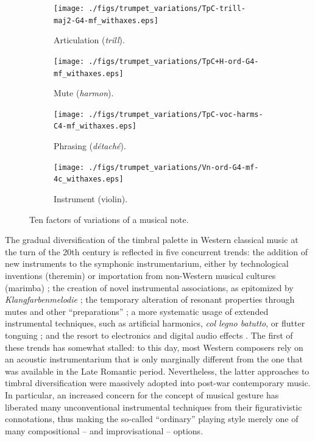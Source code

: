 \begin{figure}
        \begin{subfigure}[b]{0.25\textwidth}
                \centering
                \texttt{[image: ./figs/trumpet\_variations/TpC-trill-maj2-G4-mf\_withaxes.eps]}
                \caption{Articulation (\emph{trill}).}
                \label{fig:TpC-trill-maj2-G4-mf_withaxes}
        \end{subfigure}%
        \begin{subfigure}[b]{0.25\textwidth}
                \centering
                \texttt{[image: ./figs/trumpet\_variations/TpC+H-ord-G4-mf\_withaxes.eps]}
                \caption{Mute (\emph{harmon}).}
                \label{fig:TpC+H-ord-G4-mf_withaxes}
        \end{subfigure}

        \begin{subfigure}[b]{0.25\textwidth}
                \centering
                \texttt{[image: ./figs/trumpet\_variations/TpC-voc-harms-C4-mf\_withaxes.eps]}
                \caption{Phrasing (\emph{d\'{e}tach\'{e}}).}
                \label{fig:TpC+voc-harms-G4-mf_withaxes}
        \end{subfigure}%
        \begin{subfigure}[b]{0.25\textwidth}
                \centering
                \texttt{[image: ./figs/trumpet\_variations/Vn-ord-G4-mf-4c\_withaxes.eps]}
                \caption{Instrument (violin).}
                \label{fig:Vn-ord-G4-mf-4c}
        \end{subfigure}
        \caption{Ten factors of variations of a musical note.}\label{fig:trumpet-variations}
\end{figure}

The gradual diversification of the timbral palette in Western classical music at the turn of the 20th century is reflected in five concurrent trends:
the addition of new instruments to the symphonic instrumentarium, either by technological inventions (\eg theremin) or importation from non-Western musical cultures (\eg marimba) \cite[epilogue]{sachs2012book};
the creation of novel instrumental associations, as epitomized by \emph{Klangfarbenmelodie} \cite[chapter 22]{schoenberg2010book};
the temporary alteration of resonant properties through mutes and other ``preparations'' \cite{dianova2007phd};
a more systematic usage of extended instrumental techniques, such as artificial harmonics, \emph{col legno batutto}, or flutter tonguing \cite[chapter 11]{kostka2016book};
and the resort to electronics and digital audio effects \cite{zolzer2011dafx}.
The first of these trends has somewhat stalled: to this day, most Western composers rely on an acoustic instrumentarium that is only marginally different from the one that was available in the Late Romantic period.
Nevertheless, the latter approaches to timbral diversification were massively adopted into post-war contemporary music.
In particular, an increased concern for the concept of musical gesture \cite{godoy2009book} has liberated many unconventional instrumental techniques from their figurativistic connotations, thus making the so-called ``ordinary'' playing style merely one of many compositional -- and improvisational -- options.

